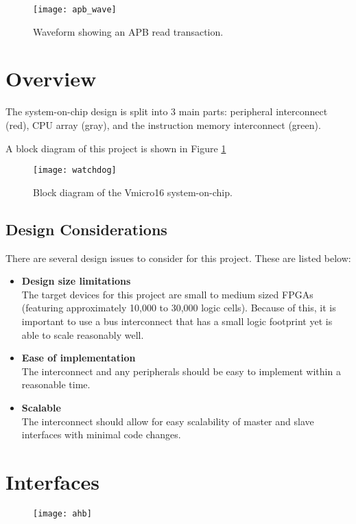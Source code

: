 \begin{figure}[H]
\centering
\texttt{[image: apb\_wave]}
\caption{Waveform showing an APB read transaction.}
\end{figure}

\section{Overview}
The system-on-chip design is split into 3 main parts: peripheral interconnect (red), CPU array (gray), and the instruction memory interconnect (green).

A block diagram of this project is shown in Figure \ref{fig:watchdog}
\begin{figure}[H]
\centering
\texttt{[image: watchdog]}
\caption{Block diagram of the Vmicro16 system-on-chip.}
\label{fig:watchdog}
\end{figure}

\subsection{Design Considerations}
There are several design issues to consider for this project. These are listed below:

\begin{itemize}
\item \textbf{Design size limitations}\\
The target devices for this project are small to medium sized FPGAs (featuring approximately 10,000 to 30,000 logic cells). Because of this, it is important to use a bus interconnect that has a small logic footprint yet is able to scale reasonably well.

\item \textbf{Ease of implementation}\\
The interconnect and any peripherals should be easy to implement within a reasonable time.

\item \textbf{Scalable}\\
The interconnect should allow for easy scalability of master and slave interfaces with minimal code changes.
\end{itemize}

\section{Interfaces}

\begin{figure}[H]
\centering
\texttt{[image: ahb]}
\end{figure}

